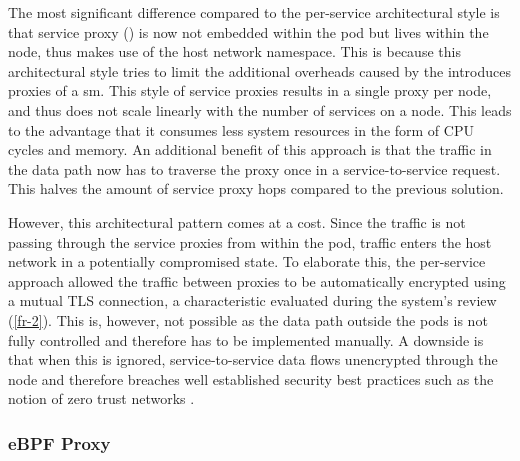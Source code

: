     
    

The most significant difference compared to the per-service architectural style is that service proxy () is now not embedded within the \gls{pod} but lives within the node, thus makes use of the host network namespace. This is because this architectural style tries to limit the additional overheads caused by the introduces proxies of a \gls{sm}. This style of service proxies results in a single proxy per node, and thus does not scale linearly with the number of services on a node. This leads to the advantage that it consumes less system resources in the form of CPU cycles and memory. An additional benefit of this approach is that the traffic in the data path now has to traverse the proxy once in a service-to-service request. This halves the amount of service proxy hops compared to the previous solution. 

However, this architectural pattern comes at a cost. Since the traffic is not passing through the service proxies from within the pod, traffic enters the host network in a potentially compromised state. To elaborate this, the per-service approach allowed the traffic between proxies to be automatically encrypted using a mutual TLS connection, a characteristic evaluated during the system's review (\ref{fr-2}). This is, however, not possible as the data path outside the \glspl{pod} is not fully controlled and therefore has to be implemented manually. A downside is that when this is ignored, service-to-service data flows unencrypted through the node and therefore breaches well established security best practices such as the notion of zero trust networks \cite{zero-trust-network}.




\subsubsection{eBPF Proxy}
\label{sec:survey:analysis:architectures:ebpf}

